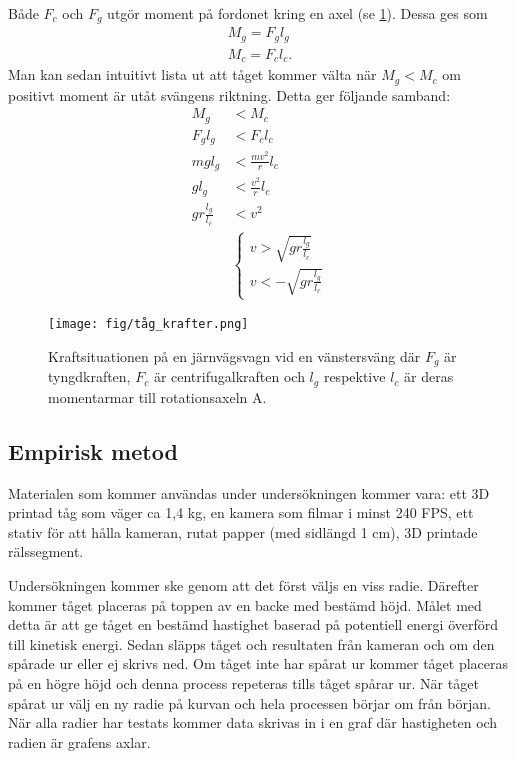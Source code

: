 Både $F_c$ och $F_g$ utgör moment på fordonet kring en axel (se \cref{fig:tåg_krafter_sväng}). Dessa ges som
\begin{gather}
    M_g = F_g l_g \\
    M_c = F_c l_c.
\end{gather}
Man kan sedan intuitivt lista ut att tåget kommer välta när $M_g < M_c$  om positivt moment är utåt svängens riktning. Detta ger följande samband:
\begin{align*}
    M_g &< M_c \\
    F_g l_g &< F_c l_c \\
    mg l_g &< \frac{mv^2}{r} l_c \\
    g l_g &< \frac{v^2}{r} l_c \\
    g r \frac{l_g}{l_c} &< v^2 \\
    &\left\{
        \begin{array}{l}
            v > \sqrt{g r \frac{l_g}{l_c}} \\
            v < -\sqrt{g r \frac{l_g}{l_c}}
        \end{array}
    \right.
\end{align*}

\begin{figure}[h!]
    \centering
    \texttt{[image: fig/tåg\_krafter.png]}
    \caption{Kraftsituationen på en järnvägsvagn vid en vänstersväng där $F_g$ är tyngdkraften, $F_c$ är centrifugalkraften och $l_g$ respektive $l_c$ är deras momentarmar till rotationsaxeln A.}
    \label{fig:tåg_krafter_sväng}
\end{figure}

\subsection{Empirisk metod}
Materialen som kommer användas under undersökningen kommer vara: ett 3D printad tåg som väger ca 1,4 kg, en kamera som filmar i minst 240 FPS, ett stativ för att hålla kameran, rutat papper (med sidlängd 1 cm), 3D printade rälssegment.

Undersökningen kommer ske genom att det först väljs en viss radie. Därefter kommer tåget placeras på toppen av en backe med bestämd höjd. Målet med detta är att ge tåget en bestämd hastighet baserad på potentiell energi överförd till kinetisk energi. Sedan släpps tåget och resultaten från kameran och om den spårade ur eller ej skrivs ned. Om tåget inte har spårat ur kommer tåget placeras på en högre höjd och denna process repeteras tills tåget spårar ur. När tåget spårat ur välj en ny radie på kurvan och hela processen börjar om från början. När alla radier har testats kommer data skrivas in i en graf där hastigheten och radien är grafens axlar.



